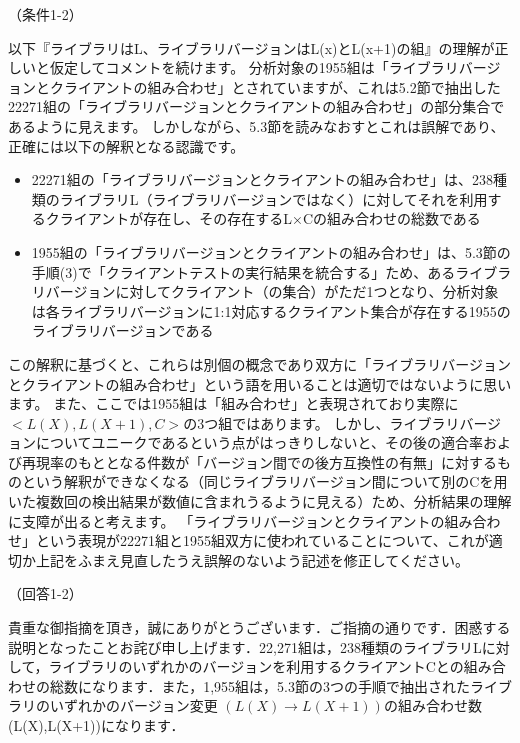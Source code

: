 \documentclass{jarticle} %
\def\subsection#1{ \vspace{1pc} {\gt #1} }
\begin{document}
\newpage
\subsection{（条件1-2）}

以下『ライブラリはL、ライブラリバージョンはL(x)とL(x+1)の組』の理解が正しいと仮定してコメントを続けます。
分析対象の1955組は「ライブラリバージョンとクライアントの組み合わせ」とされていますが、これは5.2節で抽出した22271組の「ライブラリバージョンとクライアントの組み合わせ」の部分集合であるように見えます。
しかしながら、5.3節を読みなおすとこれは誤解であり、正確には以下の解釈となる認識です。
\begin{itemize}
\item 22271組の「ライブラリバージョンとクライアントの組み合わせ」は、238種類のライブラリL（ライブラリバージョンではなく）に対してそれを利用するクライアントが存在し、その存在するL×Cの組み合わせの総数である
\item 1955組の「ライブラリバージョンとクライアントの組み合わせ」は、5.3節の手順(3)で「クライアントテストの実行結果を統合する」ため、あるライブラリバージョンに対してクライアント（の集合）がただ1つとなり、分析対象は各ライブラリバージョンに1:1対応するクライアント集合が存在する1955のライブラリバージョンである
\end{itemize}
この解釈に基づくと、これらは別個の概念であり双方に「ライブラリバージョンとクライアントの組み合わせ」という語を用いることは適切ではないように思います。
また、ここでは1955組は「組み合わせ」と表現されており実際に$<L(X),L(X+1),C>$の3つ組ではあります。
しかし、ライブラリバージョンについてユニークであるという点がはっきりしないと、その後の適合率および再現率のもととなる件数が「バージョン間での後方互換性の有無」に対するものという解釈ができなくなる（同じライブラリバージョン間について別のCを用いた複数回の検出結果が数値に含まれうるように見える）ため、分析結果の理解に支障が出ると考えます。
「ライブラリバージョンとクライアントの組み合わせ」という表現が22271組と1955組双方に使われていることについて、これが適切か上記をふまえ見直したうえ誤解のないよう記述を修正してください。


\subsection{（回答1-2）}

貴重な御指摘を頂き，誠にありがとうございます．ご指摘の通りです．困惑する説明となったことお詫び申し上げます．22,271組は，238種類のライブラリLに対して，ライブラリのいずれかのバージョンを利用するクライアントCとの組み合わせの総数になります．また，1,955組は，5.3節の3つの手順で抽出されたライブラリのいずれかのバージョン変更 $(L(X) \rightarrow L(X+1))$の組み合わせ数(L(X),L(X+1))になります．
\end{document}
